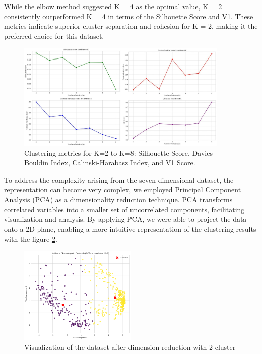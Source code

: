 \documentclass{llncs}
\begin{document}
 While the elbow method suggested K = 4 as the optimal value, K = 2 consistently outperformed K = 4 in terms of the Silhouette Score and V1. These metrics indicate superior cluster separation and cohesion for K = 2, making it the preferred choice for this dataset.
 
 \begin{figure}[h!]
 	\begin{center}  %
 		\includegraphics[width=0.9\textwidth]{images/kmeans.jpg}
 		\caption{Clustering metrics for K=2 to K=8: Silhouette Score, Davies-Bouldin Index, Calinski-Harabasz Index, and V1 Score.}
 		\label{fig:kmean}
 	\end{center}
 \end{figure}
 
 To address the complexity arising from the seven-dimensional dataset, the representation can become very complex, we employed Principal Component Analysis (PCA) as a dimensionality reduction technique. PCA transforms correlated variables into a smaller set of uncorrelated components, facilitating visualization and analysis. By applying PCA, we were able to project the data onto a 2D plane, enabling a more intuitive representation of the clustering results with the figure \ref{fig:kmean_representacion}.
 
  \begin{figure}[h!]
	\begin{center}  %
		\includegraphics[width=0.5\textwidth]{images/kmeans_PCA_with_2_components_ k=2.png}
		\caption{Visualization of the dataset after dimension reduction with 2 cluster}
		\label{fig:kmean_representacion}
	\end{center}
\end{figure}
 
\end{document}
